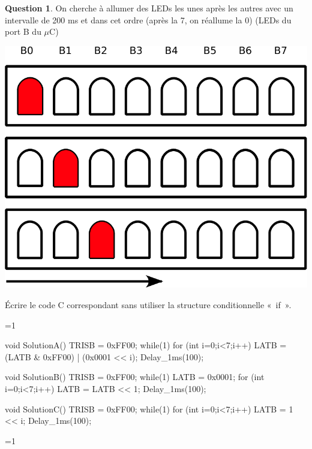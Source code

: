 \documentclass[11pt,a4paper,dvipsnames]{article}
\theoremstyle{definition}%
\newtheorem{Q}{Question}[] %
\newcounter{reponseCnt}
\begin{document}
\begin{Q}
On cherche à allumer des LEDs les unes après les autres avec un intervalle
de 200 ms et dans cet ordre (après la 7, on réallume la 0) (LEDs du port B du $\mu$C)
\begin{center}
    \includegraphics[scale=0.4]{diagrampdf-crop.pdf}
\end{center}
Écrire le code C correspondant sans utiliser la structure conditionnelle «~if~».


\ifnum\value{reponseCnt}=1
	\begin{uC}
	void SolutionA() {
		TRISB = 0xFF00;
		while(1)
		{
		  for (int i=0;i<7;i++)
		  {
		     LATB = (LATB & 0xFF00) | (0x0001 << i);
		     Delay_1ms(100);
		  }
		}
	}

	void SolutionB() {
		TRISB = 0xFF00;
		while(1)
		{
		  LATB = 0x0001;
		  for (int i=0;i<7;i++)
		  {
		     LATB = LATB << 1;
		     Delay_1ms(100);
		  }
		}
	}

	void SolutionC() {
		TRISB = 0xFF00;
		while(1)
		{
		  for (int i=0;i<7;i++)
		  {
		     LATB = 1 << i;
		     Delay_1ms(100);
		  }
		}
	}
\end{uC}
\fi

\end{Q}
\ifnum\value{reponseCnt}=1
  \newpage
\fi
\end{document}
